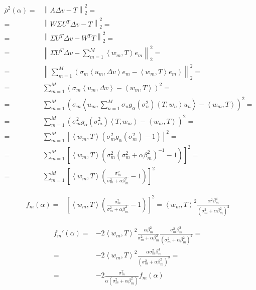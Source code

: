\documentclass[a4paper,10pt]{article}
\theoremstyle{plain}
\theoremstyle{definition}
\theoremstyle{remark}
\newcommand{\obar}[1]{\overline{#1}}
\newcommand{\pa}[1]{\left(#1\right)}
\newcommand{\ang}[1]{\left<#1\right>}
\newcommand{\bra}[1]{\left[#1\right]}
\newcommand{\norm}[1]{\left\|#1\right\|}
\begin{document}
\begin{align*}
  \obar{\rho} ^2 (\alpha) =& \norm{ A \Delta v - T}_2 ^2 = \\
  =& \norm{ W \Sigma U ^T \Delta v - T}_2 ^2 = \\
  =& \norm{ \Sigma U ^T \Delta v - W^T T}_2 ^2 = \\
  = & \norm{ \Sigma U ^T \Delta v - \sum_{m=1} ^M \ang{w_m, T}e_m }_2
  ^2 = \\
  = & \norm{ \sum _{m=1} ^M \pa{ \sigma _m \ang{u_m, \Delta v} e_m -
      \ang{w_m, T}e_m } }_2 ^2 = \\
  = & \sum _{m=1} ^M \pa{ \sigma _m \ang{u_m, \Delta v} -
    \ang{w_m, T} } ^2 = \\
  = & \sum _{m=1} ^M \pa{ \sigma _m \ang{u_m , \sum _{n=1} ^M \sigma
      _n g_\alpha \pa{\sigma_n ^2 } \ang{T,w_n} u_n} - \ang{w_m, T} }
  ^2 = \\
  = & \sum _{m=1} ^M \pa{ \sigma _m ^2 g_\alpha \pa{\sigma_m ^2
    } \ang{T,w_m} - \ang{w_m, T} }^2 = \\
  = &\sum _{m=1} ^M \bra{ \ang{w_m, T} \pa{ \sigma _m ^2 g_\alpha
      \pa{\sigma_m ^2 } -1 }  } ^2 = \\
  = & \sum _{m=1} ^M \bra{ \ang{w_m, T} \pa{ \sigma _m ^2 \pa{ \sigma
        _m ^2 + \alpha \beta _m ^2 } ^ {-1}  - 1 } } ^2 = \\
  = & \sum _{m=1} ^M \bra{ \ang{w_m, T} \pa{ \frac{\sigma _m ^2}{
        \sigma _m ^2 + \alpha \beta _m ^2 } - 1 } } ^2
\end{align*}

\begin{align*}
  f_m(\alpha) = & \bra{ \ang{w_m, T} \pa{ \frac{\sigma _m ^2}{ \sigma
        _m ^2 + \alpha \beta _m ^2 } - 1 } } ^2 = \ang{w_m, T} ^2
  \frac{\alpha ^2 \beta _m ^ 4}{ \pa { \sigma _m ^2 + \alpha \beta _m
      ^2 } ^2 }
\end{align*}

\begin{align*}
  f_m ' (\alpha) = & -2 \ang{w_m, T} ^2 \frac{ \alpha \beta _m ^2}{
    \sigma _m ^2 + \alpha \beta _m ^2} \frac{ \sigma _m ^2 \beta _m ^2
  } { \pa { \sigma _m ^2 + \alpha \beta _m ^2 } ^2 } = \\
  = & -2 \ang{w_m, T} ^2 \frac{\alpha \sigma _m ^2 \beta _m ^4 }{ \pa
    { \sigma _m ^2 + \alpha \beta _m ^2 } ^3 } = \\
  = & -2 \frac{\sigma _m ^2 }{\alpha \pa { \sigma _m ^2 + \alpha \beta
      _m ^2 } } f_m(\alpha) 
\end{align*}
\end{document}
